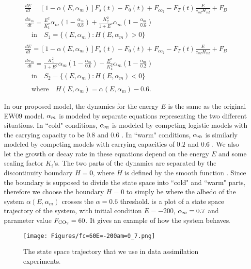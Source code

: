 \begin{align}
&\frac{dE}{dt}=[1-\alpha(E,\alpha_{m})]F_s(t)-F_0(t)+F_{co_2}-F_T(t)\frac{E}{c_{ml} H_{ml}}+F_B &\nonumber \\
&\frac{d \alpha_{m}}{dt}= \frac{E^2}{K_1^2}\alpha_{m}\left(1-\frac{\alpha_{m}}{0.8}\right) + \frac{K_2^2}{1+E^2}\alpha_{m}\left(1-\frac{\alpha_{m}}{0.6}\right) &\nonumber \\
&\quad \textrm{in}  \quad S_1=\{(E,\alpha_m): H(E,\alpha_m)>0\} &\label{eq:coldalph} \\
&\nonumber\\
&\frac{dE}{dt}=[1-\alpha(E,\alpha_{m})]F_s(t)-F_0(t)+F_{co_2}-F_T(t)\frac{E}{c_{ml} H_{ml}}+F_B &\nonumber \\
&\frac{ d \alpha_{m}}{dt}=\frac{K_3^2}{1+E^2}\alpha_{m}\left(1-\frac{\alpha_{m}}{0.6}\right) +\frac{E^2}{K_4^2}\alpha_{m}\left(1-\frac{\alpha_{m}}{0.2}\right) &\nonumber \\
&\quad \textrm{in}  \quad S_2=\{(E,\alpha_m): H(E,\alpha_m)<0\}&\label{eq:warmalph}\\
&\nonumber\\
&\quad \textrm{where} \quad H(E,\alpha_m)=\alpha(E,\alpha_m)-0.6 \label{eq:H}.
\end{align}

\par In our proposed model, the dynamics for the energy $E$ is the same as the original EW09 model. $\alpha_m$ is modeled by separate equations representing the two different situations. In ``cold" conditions, $\alpha_m$ is modeled by competing logistic models with the carrying capacity to be $0.8$ and $0.6$ . In ``warm" conditions, $\alpha_m$ is similarly modeled by competing models with carrying capacities of $0.2$ and $0.6$ . We also let the growth or decay rate in these equations depend on the energy $E$ and some scaling factor $K_i$'s. The two parts of the dynamics are separated by the discontinuity boundary $H=0$, where $H$ is defined by the smooth function . Since the boundary is supposed to divide the state space into ``cold" and ``warm" parts, therefore we choose the boundary $H=0$ to simply be where the albedo of the system $\alpha(E,\alpha_m)$ crosses the $\alpha=0.6$ threshold.  is a plot of a state space trajectory of the system, with initial condition $E=-200$, $\alpha_m=0.7$ and parameter value $F_{\text{CO}_2}=60$. It gives an example of how the system behaves.

\begin{figure}\label{fig:onetrajectory}
\begin{center}
\texttt{[image: Figures/fc=60E=-200am=0\_7.png]} 
\end{center}
\caption{The state space trajectory that we use in data assimilation experiments.}
\end{figure}


